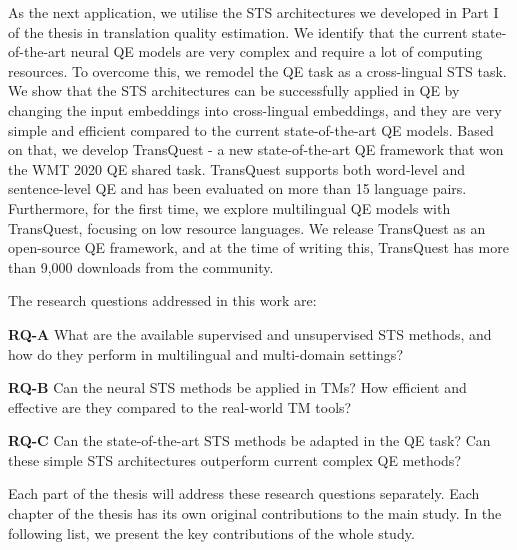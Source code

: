 As the next application, we utilise the STS architectures we developed in Part I of the thesis in translation quality estimation. We identify that the current state-of-the-art neural QE models are very complex and require a lot of computing resources. To overcome this, we remodel the QE task as a cross-lingual STS task.  We show that the STS architectures can be successfully applied in QE by changing the input embeddings into cross-lingual embeddings, and they are very simple and efficient compared to the current state-of-the-art QE models. Based on that, we develop TransQuest - a new state-of-the-art QE framework that won the WMT 2020 QE shared task. TransQuest supports both word-level and sentence-level QE and has been evaluated on more than 15 language pairs. Furthermore, for the first time, we explore multilingual QE models with TransQuest, focusing on low resource languages. We release TransQuest as an open-source QE framework, and at the time of writing this, TransQuest has more than 9,000 downloads from the community. 

The research questions addressed in this work are: 

\textbf{RQ-A} What are the available supervised and unsupervised STS methods, and how do they perform in multilingual and multi-domain settings? 

\textbf{RQ-B} Can the neural STS methods be applied in TMs? How efficient and effective are they compared to the real-world TM tools?

\textbf{RQ-C} Can the state-of-the-art STS methods be adapted in the QE task? Can these simple STS architectures outperform current complex QE methods? 

Each part of the thesis will address these research questions separately. Each chapter of the thesis has its own original contributions to the main study. In the following list, we present the key contributions of the whole study.

